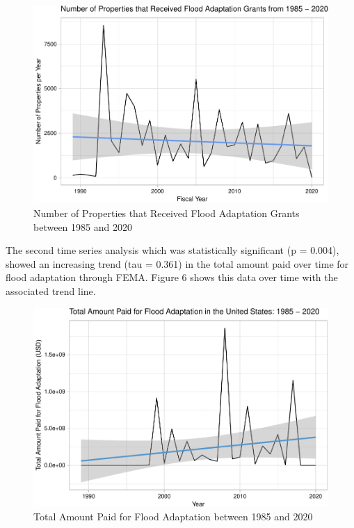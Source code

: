 \documentclass[
  12pt,
]{article}
\begin{document}
\begin{figure}
\centering
\includegraphics{finalreport_files/figure-latex/unnamed-chunk-10-1.pdf}
\caption{Number of Properties that Received Flood Adaptation Grants
between 1985 and 2020}
\end{figure}

The second time series analysis which was statistically significant (p =
0.004), showed an increasing trend (tau = 0.361) in the total amount
paid over time for flood adaptation through FEMA. Figure 6 shows this
data over time with the associated trend line. \newpage

\begin{figure}
\centering
\includegraphics{finalreport_files/figure-latex/unnamed-chunk-11-1.pdf}
\caption{Total Amount Paid for Flood Adaptation between 1985 and 2020}
\end{figure}
\end{document}
